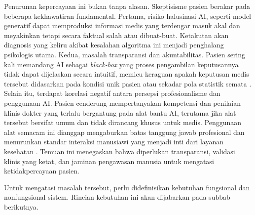 Penurunan kepercayaan ini bukan tanpa alasan. Skeptisisme pasien berakar pada beberapa kekhawatiran fundamental. Pertama, risiko halusinasi AI, seperti model generatif dapat memproduksi informasi medis yang terdengar masuk akal dan meyakinkan tetapi secara faktual salah atau dibuat-buat. Ketakutan akan diagnosis yang keliru akibat kesalahan algoritma ini menjadi penghalang psikologis utama. Kedua, masalah transparansi dan akuntabilitas. Pasien sering kali memandang AI sebagai \textit{black-box} yang proses pengambilan keputusannya tidak dapat dijelaskan secara intuitif, memicu keraguan apakah keputusan medis tersebut didasarkan pada kondisi unik pasien atau sekadar pola statistik semata \autocite{chen2025impact}.
Selain itu, terdapat korelasi negatif antara persepsi profesionalisme dan penggunaan AI. Pasien cenderung mempertanyakan kompetensi dan penilaian klinis dokter yang terlalu bergantung pada alat bantu AI, terutama jika alat tersebut bersifat umum dan tidak dirancang khusus untuk medis. Penggunaan alat semacam ini dianggap mengaburkan batas tanggung jawab profesional dan menurunkan standar interaksi manusiawi yang menjadi inti dari layanan kesehatan \autocite{chen2025impact}. Temuan ini menegaskan bahwa diperlukan transparansi, validasi klinis yang ketat, dan jaminan pengawasan manusia untuk mengatasi ketidakpercayaan pasien.

Untuk mengatasi masalah tersebut, perlu didefinisikan kebutuhan fungsional dan nonfungsional sistem. Rincian kebutuhan ini akan dijabarkan pada subbab berikutnya.

